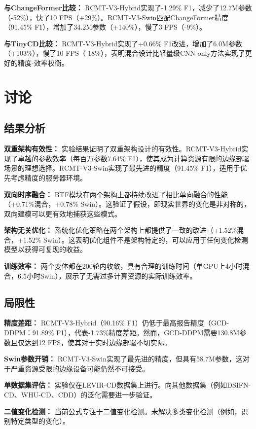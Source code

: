 \documentclass[journal]{IEEEtran}
\begin{document}
\textbf{与ChangeFormer比较：} RCMT-V3-Hybrid实现了-1.29\% F1，减少了12.7M参数（-52\%），快了10 FPS（+29\%）。RCMT-V3-Swin匹配ChangeFormer精度（91.45\% F1），增加了34.2M参数（+140\%），慢了3 FPS（-9\%）。

\textbf{与TinyCD比较：} RCMT-V3-Hybrid实现了+0.66\% F1改进，增加了6.0M参数（+103\%），慢了10 FPS（-18\%），表明混合设计比轻量级CNN-only方法实现了更好的精度-效率权衡。

\section{讨论}

\subsection{结果分析}

\textbf{双重架构有效性：} 实验结果证明了双重架构设计的有效性。RCMT-V3-Hybrid实现了卓越的参数效率（每百万参数7.64\% F1），使其成为计算资源有限的边缘部署场景的理想选择。RCMT-V3-Swin实现了最先进的精度（91.45\% F1），适用于优先考虑精度的服务器环境。

\textbf{双向时序融合：} BTF模块在两个架构上都持续改进了相比单向融合的性能（+0.71\%混合，+0.78\% Swin）。这验证了假设，即现实世界的变化是非对称的，双向建模可以更有效地捕获这些模式。

\textbf{架构无关优化：} 系统化优化策略在两个架构上都提供了一致的改进（+1.52\%混合，+1.52\% Swin）。这表明优化组件不是架构特定的，可以应用于任何变化检测模型以获得可复现的收益。

\textbf{训练效率：} 两个变体都在200轮内收敛，具有合理的训练时间（单GPU上4小时混合，6.5小时Swin），展示了无需过多计算资源的实际训练效率。

\subsection{局限性}

\textbf{精度差距：} RCMT-V3-Hybrid（90.16\% F1）仍低于最高报告精度（GCD-DDPM：91.89\% F1），代表-1.73\%精度差距。然而，GCD-DDPM需要130.8M参数且仅达到12 FPS，使其对于实时边缘部署不切实际。

\textbf{Swin参数开销：} RCMT-V3-Swin实现了最先进的精度，但具有58.7M参数，这对于严重资源受限的边缘设备可能仍然不可接受。

\textbf{单数据集评估：} 实验仅在LEVIR-CD数据集上进行。向其他数据集（例如DSIFN-CD、WHU-CD、CDD）的泛化需要进一步验证。

\textbf{二值变化检测：} 当前公式专注于二值变化检测。未解决多类变化检测（例如，识别特定类型的变化）。
\end{document}
